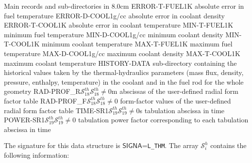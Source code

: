 \begin{DescriptionEnregistrement}{Main records and sub-directories in }{8.0cm}
\RealEnr
  {ERROR-T-FUEL}{1}{K}
  {absolute error in fuel temperature}
\RealEnr
  {ERROR-D-COOL}{1}{g/cc}
  {absolute error in coolant density}
\RealEnr
  {ERROR-T-COOL}{1}{K}
  {absolute error in coolant temperature}
\RealEnr
  {MIN-T-FUEL}{1}{K}
  {minimum fuel temperature}
\RealEnr
  {MIN-D-COOL}{1}{g/cc}
  {minimum coolant density}
\RealEnr
  {MIN-T-COOL}{1}{K}
  {minimum coolant temperature}
\RealEnr
  {MAX-T-FUEL}{1}{K}
  {maximum fuel temperature}
\RealEnr
  {MAX-D-COOL}{1}{g/cc}
  {maximum coolant density}
\RealEnr
  {MAX-T-COOL}{1}{K}
  {maximum coolant temperature}
 \DirEnr
  {HISTORY-DATA}
  {sub-directory containing the historical values taken by the thermal-hydraulics parameters (mass flux, density, pressure, enthalpy, temperature)
  in the coolant and in the fuel rod for the whole geometry}
\OptRealEnr
  {RAD-PROF\_R}{$\mathcal{S}^{th}_{18}$}{$\mathcal{S}^{th}_{18}\ne 0$}{m}
  {abscissas of the user-defined radial form factor table}
\OptRealEnr
  {RAD-PROF\_F}{$\mathcal{S}^{th}_{18}$}{$\mathcal{S}^{th}_{18}\ne 0$}{ }
  {form-factor values of the user-defined radial form factor table}
\OptRealEnr
  {TIME-SR1}{$\mathcal{S}^{th}_{19}$}{$\mathcal{S}^{th}_{19}\ne 0$}{s}
  {tabulation abscissa in time}
\OptRealEnr
  {POWER-SR1}{$\mathcal{S}^{th}_{19}$}{$\mathcal{S}^{th}_{19}\ne 0$}{ }
  {tabulation power factor corresponding to each tabulation abscissa in time}
\end{DescriptionEnregistrement}

The signature for this data structure is $\mathsf{SIGNA}$=\verb*|L_THM|. The array $\mathcal{S}^{h}_{i}$
contains the following information: 

